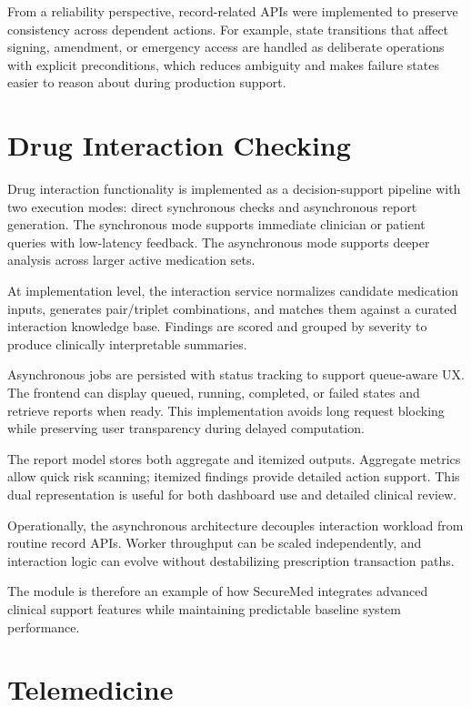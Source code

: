 From a reliability perspective, record-related APIs were implemented to preserve consistency across dependent actions. For example, state transitions that affect signing, amendment, or emergency access are handled as deliberate operations with explicit preconditions, which reduces ambiguity and makes failure states easier to reason about during production support.

\section{Drug Interaction Checking}\label{57-drug-interaction-checking}

Drug interaction functionality is implemented as a decision-support pipeline with two execution modes: direct synchronous checks and asynchronous report generation. The synchronous mode supports immediate clinician or patient queries with low-latency feedback. The asynchronous mode supports deeper analysis across larger active medication sets.

At implementation level, the interaction service normalizes candidate medication inputs, generates pair/triplet combinations, and matches them against a curated interaction knowledge base. Findings are scored and grouped by severity to produce clinically interpretable summaries.

Asynchronous jobs are persisted with status tracking to support queue-aware UX. The frontend can display queued, running, completed, or failed states and retrieve reports when ready. This implementation avoids long request blocking while preserving user transparency during delayed computation.

The report model stores both aggregate and itemized outputs. Aggregate metrics allow quick risk scanning; itemized findings provide detailed action support. This dual representation is useful for both dashboard use and detailed clinical review.

Operationally, the asynchronous architecture decouples interaction workload from routine record APIs. Worker throughput can be scaled independently, and interaction logic can evolve without destabilizing prescription transaction paths.

The module is therefore an example of how SecureMed integrates advanced clinical support features while maintaining predictable baseline system performance.

\section{Telemedicine}\label{58-telemedicine}

